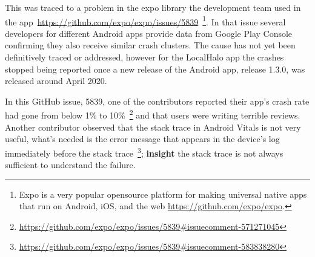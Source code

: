This was traced to a problem in the expo library the development team used in the app~\url{https://github.com/expo/expo/issues/5839}~\footnote{Expo is a very popular opensource platform for making universal native apps that run on Android, iOS, and the web \url{https://github.com/expo/expo}.}. In that issue several developers for different Android apps provide data from Google Play Console confirming they also receive similar crash clusters. The cause has not yet been definitively traced or addressed, however for the LocalHalo app the crashes stopped being reported once a new release of the Android app, release 1.3.0, was released around  April 2020.

In this GitHub issue, 5839, one of the contributors reported their app's crash rate had gone from below 1\% to 10\%~\footnote{\url{https://github.com/expo/expo/issues/5839\#issuecomment-571271045}} and that users were writing terrible reviews. Another contributor observed that the stack trace in Android Vitals is not very useful, what's needed is the error message that appears in the device's log immediately before the stack trace~\footnote{\url{https://github.com/expo/expo/issues/5839\#issuecomment-583838280}}; 
\textbf{insight} the stack trace is not always sufficient to understand the failure\label{insight-expo-stack-trace-not-sufficient-to-identify-the-failure}.

